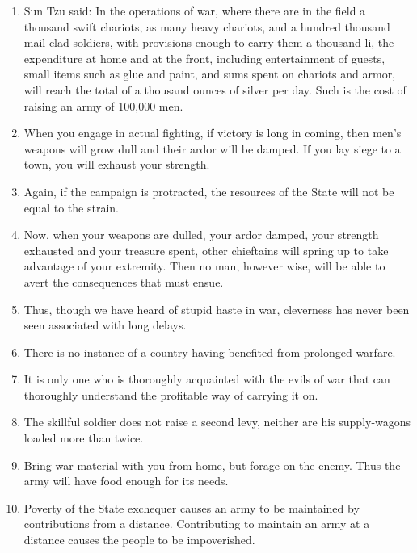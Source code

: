 \begin{enumerate}
\item Sun Tzu said:  In the operations of war,
    where there are in the field a thousand swift chariots,
    as many heavy chariots, and a hundred thousand
    mail-clad soldiers, with provisions enough to carry them
    a thousand li, the expenditure at home and at the front,
    including entertainment of guests, small items such as
    glue and paint, and sums spent on chariots and armor,
    will reach the total of a thousand ounces of silver per day. 
    Such is the cost of raising an army of 100,000 men.

\item When you engage in actual fighting, if victory
    is long in coming, then men's weapons will grow dull and
    their ardor will be damped.  If you lay siege to a town,
    you will exhaust your strength.

\item Again, if the campaign is protracted, the resources
    of the State will not be equal to the strain.

\item Now, when your weapons are dulled, your ardor damped,
    your strength exhausted and your treasure spent,
    other chieftains will spring up to take advantage
    of your extremity.  Then no man, however wise,
    will be able to avert the consequences that must ensue.

\item Thus, though we have heard of stupid haste in war,
    cleverness has never been seen associated with long delays.

\item There is no instance of a country having benefited
    from prolonged warfare.

\item It is only one who is thoroughly acquainted
    with the evils of war that can thoroughly understand
    the profitable way of carrying it on.

\item The skillful soldier does not raise a second levy,
    neither are his supply-wagons loaded more than twice.

\item Bring war material with you from home, but forage
    on the enemy.  Thus the army will have food enough
    for its needs.

\item Poverty of the State exchequer causes an army
    to be maintained by contributions from a distance. 
    Contributing to maintain an army at a distance causes
    the people to be impoverished.


\end{enumerate}
